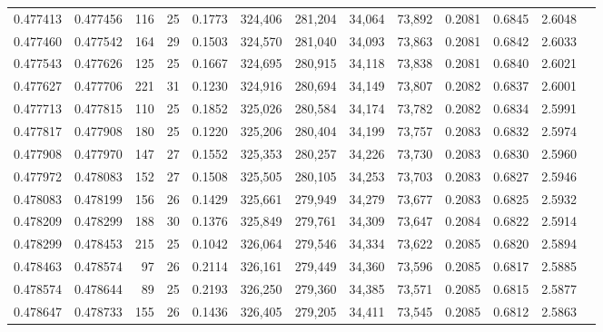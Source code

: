 \begin{tabular}{rrrrrrrrrrrrr}
0.477413 & 0.477456 & 116 &  25 &                                     0.1773 & 324,406 & 281,204 &  34,064 &  73,892 & 0.2081 & 0.6845 & 2.6048 \\
0.477460 & 0.477542 & 164 &  29 &                                     0.1503 & 324,570 & 281,040 &  34,093 &  73,863 & 0.2081 & 0.6842 & 2.6033 \\
0.477543 & 0.477626 & 125 &  25 &                                     0.1667 & 324,695 & 280,915 &  34,118 &  73,838 & 0.2081 & 0.6840 & 2.6021 \\
0.477627 & 0.477706 & 221 &  31 &                                     0.1230 & 324,916 & 280,694 &  34,149 &  73,807 & 0.2082 & 0.6837 & 2.6001 \\
0.477713 & 0.477815 & 110 &  25 &                                     0.1852 & 325,026 & 280,584 &  34,174 &  73,782 & 0.2082 & 0.6834 & 2.5991 \\
0.477817 & 0.477908 & 180 &  25 &                                     0.1220 & 325,206 & 280,404 &  34,199 &  73,757 & 0.2083 & 0.6832 & 2.5974 \\
0.477908 & 0.477970 & 147 &  27 &                                     0.1552 & 325,353 & 280,257 &  34,226 &  73,730 & 0.2083 & 0.6830 & 2.5960 \\
0.477972 & 0.478083 & 152 &  27 &                                     0.1508 & 325,505 & 280,105 &  34,253 &  73,703 & 0.2083 & 0.6827 & 2.5946 \\
0.478083 & 0.478199 & 156 &  26 &                                     0.1429 & 325,661 & 279,949 &  34,279 &  73,677 & 0.2083 & 0.6825 & 2.5932 \\
0.478209 & 0.478299 & 188 &  30 &                                     0.1376 & 325,849 & 279,761 &  34,309 &  73,647 & 0.2084 & 0.6822 & 2.5914 \\
0.478299 & 0.478453 & 215 &  25 &                                     0.1042 & 326,064 & 279,546 &  34,334 &  73,622 & 0.2085 & 0.6820 & 2.5894 \\
0.478463 & 0.478574 &  97 &  26 &                                     0.2114 & 326,161 & 279,449 &  34,360 &  73,596 & 0.2085 & 0.6817 & 2.5885 \\
0.478574 & 0.478644 &  89 &  25 &                                     0.2193 & 326,250 & 279,360 &  34,385 &  73,571 & 0.2085 & 0.6815 & 2.5877 \\
0.478647 & 0.478733 & 155 &  26 &                                     0.1436 & 326,405 & 279,205 &  34,411 &  73,545 & 0.2085 & 0.6812 & 2.5863 \\

\end{tabular}
